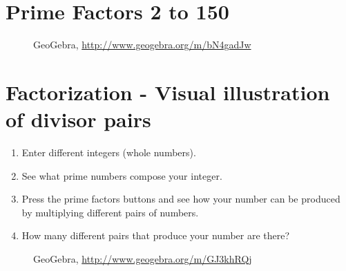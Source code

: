 \section{{Prime Factors 2 to 150}}
\begin{figure}[H]
\begin{center}
\caption*{GeoGebra, \url{http://www.geogebra.org/m/bN4gadJw}}
\end{center}
\end{figure}

\section{{Factorization - Visual illustration of divisor pairs}}
\begin{enumerate}[label=\arabic*.]

\item Enter different integers (whole numbers).

\item See what prime numbers compose your integer.

\item Press the prime factors buttons and see how your number can be produced by multiplying different pairs of numbers.

\item How many different pairs that produce your number are there?

\end{enumerate}

\begin{figure}[H]
\begin{center}
\caption*{GeoGebra, \url{http://www.geogebra.org/m/GJ3khRQj}}
\end{center}
\end{figure}

